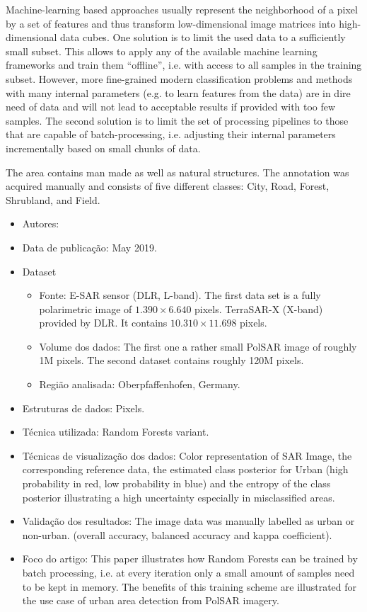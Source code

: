 \documentclass[paper=a4, fontsize=11pt]{scrartcl}
\begin{document}
Machine-learning based approaches usually represent the neighborhood of a pixel by a set of features and thus transform low-dimensional image matrices into high-dimensional data cubes.
One solution is to limit the used data to a sufficiently small subset.
This allows to apply any of the available machine learning frameworks and train them “offline”, i.e. with access to all samples in the training subset.
However, more fine-grained modern classification problems and methods with many internal parameters (e.g. to learn features from the data) are in dire need of data and will not lead to acceptable results if provided with too few samples.
The second solution is to limit the set of processing pipelines to those that are capable of batch-processing, i.e. adjusting their internal parameters incrementally based on small chunks of data.

The area contains man made as well as natural structures.
The annotation was acquired manually and consists of five different classes: City, Road, Forest, Shrubland, and Field.

\begin{itemize}
    \item Autores:~\cite{hansch2019online}
    \item Data de publicação: May 2019.
    \item Dataset
    \begin{itemize}
        \item Fonte: E-SAR sensor (DLR, L-band). The first data set is a fully polarimetric image of $1.390 \times 6.640$ pixels. TerraSAR-X (X-band) provided by DLR. It contains $10.310 \times 11.698$ pixels.
        \item Volume dos dados: The first one a rather small PolSAR image of roughly 1M pixels. The second dataset contains roughly 120M pixels.
        \item Região analisada: Oberpfaffenhofen, Germany.
    \end{itemize}
    \item Estruturas de dados: Pixels.
    \item Técnica utilizada: Random Forests variant.
    \item Técnicas de visualização dos dados: Color representation of SAR Image, the corresponding reference data, the estimated class posterior for Urban (high probability in red, low probability in blue) and the entropy of the class posterior illustrating a high uncertainty especially in misclassified areas.
    \item Validação dos resultados: The image data was manually labelled as urban or non-urban. (overall accuracy, balanced accuracy and kappa coefficient).
    \item Foco do artigo: This paper illustrates how Random Forests can be trained by batch processing, i.e. at every iteration only a small amount of samples need to be kept in memory. The benefits of this training scheme are illustrated for the use case of urban area detection from PolSAR imagery.
\end{itemize}
\end{document}
